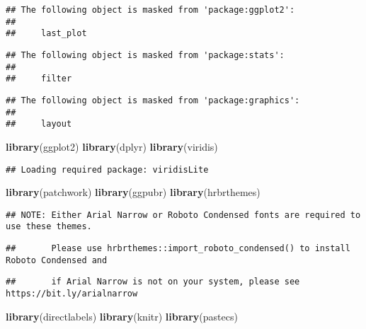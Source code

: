 \documentclass[
]{article}
\newenvironment{Shaded}{\begin{snugshade}}{\end{snugshade}}
\newcommand{\KeywordTok}[1]{\textcolor[rgb]{0.13,0.29,0.53}{\textbf{#1}}}
\newcommand{\NormalTok}[1]{#1}
\begin{document}
\begin{verbatim}
## The following object is masked from 'package:ggplot2':
## 
##     last_plot
\end{verbatim}

\begin{verbatim}
## The following object is masked from 'package:stats':
## 
##     filter
\end{verbatim}

\begin{verbatim}
## The following object is masked from 'package:graphics':
## 
##     layout
\end{verbatim}

\begin{Shaded}
\begin{Highlighting}[]
\KeywordTok{library}\NormalTok{(ggplot2)}
\KeywordTok{library}\NormalTok{(dplyr)}
\KeywordTok{library}\NormalTok{(viridis)}
\end{Highlighting}
\end{Shaded}

\begin{verbatim}
## Loading required package: viridisLite
\end{verbatim}

\begin{Shaded}
\begin{Highlighting}[]
\KeywordTok{library}\NormalTok{(patchwork)}
\KeywordTok{library}\NormalTok{(ggpubr)}
\KeywordTok{library}\NormalTok{(hrbrthemes)}
\end{Highlighting}
\end{Shaded}

\begin{verbatim}
## NOTE: Either Arial Narrow or Roboto Condensed fonts are required to use these themes.
\end{verbatim}

\begin{verbatim}
##       Please use hrbrthemes::import_roboto_condensed() to install Roboto Condensed and
\end{verbatim}

\begin{verbatim}
##       if Arial Narrow is not on your system, please see https://bit.ly/arialnarrow
\end{verbatim}

\begin{Shaded}
\begin{Highlighting}[]
\KeywordTok{library}\NormalTok{(directlabels)}
\KeywordTok{library}\NormalTok{(knitr)}
\KeywordTok{library}\NormalTok{(pastecs)}
\end{Highlighting}
\end{Shaded}
\end{document}
